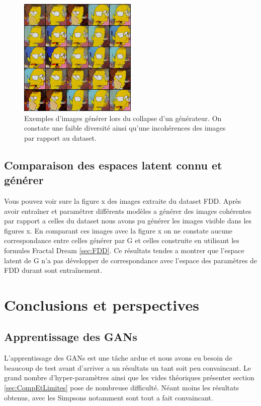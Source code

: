 \documentclass[11pt,francais]{article}
\begin{document}
\begin{figure}[t]
    \centering
    \includegraphics[width=0.5\textwidth]{Figures/LossG_et_Convergeance/collapse_980.png}
    \caption{Exemples d'images générer lors du collapse d'un générateur. On constate une faible diversité ainsi qu'une incohérences des images par rapport au dataset.}
    \label{fig:fig7}
\end{figure}

\subsection{Comparaison des espaces latent connu et générer}
\label{sec:ComparaisonLS}
Vous pouvez voir sure la figure x des images extraite du dataset FDD.
Après avoir entraîner et paramétrer différents modèles a générer des images cohérentes par rapport a celles du dataset nous avons pu générer les images visible dans les figures x. 
En comparant ces images avec la figure x on ne constate aucune correspondance entre celles générer par G et celles construite en utilisant les formules Fractal Dream \ref{sec:FDD}.
Ce résultats tendes a montrer que l'espace latent de G n'a pas développer de correspondance avec l'espace des paramètres de FDD durant sont entraînement. 


\section{Conclusions et perspectives}
\label{sec:Conclusion}

\subsection{Apprentissage des GANs}
L'apprentissage des GANs est une tâche ardue et nous avons eu besoin de beaucoup de test avant d'arriver a un résultats un tant soit peu convaincant. Le grand nombre d'hyper-paramètres ainsi que les vides théoriques présenter section \ref{sec:CompEtLimites} pose de nombreuse difficulté. Néant moins les résultats obtenus, avec les Simpsons notamment sont tout a fait convaincant.
\end{document}
